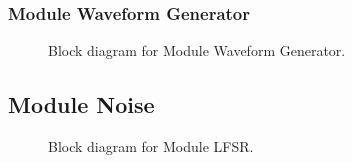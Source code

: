 \subsubsection{Module Waveform Generator}
\begin{figure}[H]
	\centering
	\caption{Block diagram for Module Waveform Generator.}
\end{figure}

\subsection{Module Noise}
\begin{figure}[H]
	\centering
	\caption{Block diagram for Module LFSR.}
\end{figure}
